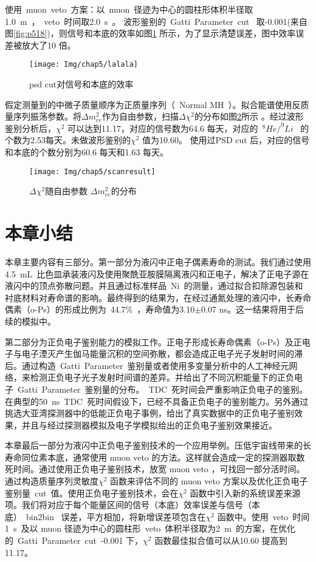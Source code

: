 使用~muon~veto~方案：以~muon~径迹为中心的圆柱形体积半径取1.0~m~，~veto~时间取2.0~s~。 波形鉴别的~Gatti~Parameter~cut~ 取-0.001(来自图\ref{fig:p518})，则信号和本底的效率如图\ref{fig:p516} 所示，为了显示清楚误差，图中效率误差被放大了10 倍。
\begin{figure}[!htb]
  \centering
   \texttt{[image: Img/chap5/lalala]}
    \caption{psd cut对信号和本底的效率}
  \label{fig:p516}
\end{figure}
假定测量到的中微子质量顺序为正质量序列（~Normal MH~）。拟合能谱使用反质量序列振荡参数。将$\Delta m^2_{ee}$作为自由参数，扫描$\Delta \chi^2$的分布如图\ref{fig:chiscan}所示 。经过波形鉴别分析后，$\chi^2$ 可以达到11.17，对应的信号数为64.6 每天，对应的~$^{8}He/^{9}Li$~ 的个数为2.53每天。未做波形鉴别的$\chi^2$ 值为10.60。 使用过PSD cut 后，对应的信号和本底的个数分别为60.6 每天和1.63 每天。
\begin{figure}[!htb]
  \centering
   \texttt{[image: Img/chap5/scanresult]}
    \caption{$\Delta \chi^2$随自由参数 $\Delta m^2_{ee}$的分布}
  \label{fig:chiscan}
\end{figure}
\section{本章小结}
本章主要内容有三部分。第一部分为液闪中正电子偶素寿命的测试。我们通过使用4.5~mL~比色皿承装液闪及使用聚酰亚胺膜隔离液闪和正电子，解决了正电子源在液闪中的顶点弥散问题。并且通过标准样品~Ni~的测量，通过拟合扣除源包装和衬底材料对寿命谱的影响。最终得到的结果为，在经过通氮处理的液闪中，长寿命偶素（o-Ps）的形成比例为~44.7\%~，寿命值为3.10$\pm$0.07 ns。这一结果将用于后续的模拟中。

第二部分为正负电子鉴别能力的模拟工作。正电子形成长寿命偶素（o-Ps）及正电子与电子湮灭产生伽马能量沉积的空间弥散，都会造成正电子光子发射时间的滞后。通过构造~Gatti~Parameter~鉴别量或者使用多变量分析中的人工神经元网络，来检测正负电子光子发射时间谱的差异。并给出了不同沉积能量下的正负电子~Gatti~Parameter~鉴别量的分布。~TDC~死时间会严重影响正负电子的鉴别。在典型的50~ns~TDC~死时间假设下，已经不具备正负电子的鉴别能力。另外通过挑选大亚湾探测器中的低能正负电子事例，给出了真实数据中的正负电子鉴别效果，并且与经过探测器模拟及电子学模拟给出的正负电子鉴别效果接近。

本章最后一部分为液闪中正负电子鉴别技术的一个应用举例。压低宇宙线带来的长寿命同位素本底，通常使用 muon veto 的方法。这样就会造成一定的探测器取数死时间。通过使用正负电子鉴别技术，放宽 muon veto ，可找回一部分活时间。通过构造质量序列灵敏度$\chi^2$ 函数来评估不同的 muon veto 方案以及优化正负电子鉴别量~cut~值。使用正负电子鉴别技术，会在$\chi^2$ 函数中引入新的系统误差来源项。我们将对应于每个能量区间的信号（本底）效率误差与信号（本底）~bin2bin~ 误差，平方相加，将新增误差项包含在$\chi^2$ 函数中。使用~veto~时间1~s~及以 muon 径迹为中心的圆柱形~veto~体积半径取为2~m~的方案，在优化的~Gatti~Parameter~cut~-0.001 下，$\chi^2$ 函数最佳拟合值可以从10.60 提高到11.17。

